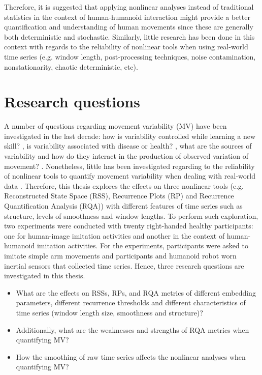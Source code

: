 Therefore, it is suggested that applying nonlinear analyses 
instead of traditional statistics in the context of human-humanoid 
interaction might provide a better quantification and understanding
of human movements since these are generally both deterministic and stochastic.
Similarly, little research has been done in this context 
with regards to the reliability of nonlinear tools 
when using real-world time series 
(e.g. window length, post-processing techniques, 
noise contamination, nonstationarity, chaotic deterministic, etc).



\section{Research questions}
A number of questions regarding movement variability (MV) have been 
investigated in the last decade:
how is variability controlled 
while learning a new skill? \citep{wagner2012, seifert2011, bartlett2007}, 
is variability associated with disease or health? 
\citep{stergiou2006, stergiou2011}, what are the sources of variability 
and how do they interact in the production of observed variation 
of movement? \citep{preatoni2007, preatoni2010, preatoni2013}.
Nonetheless, little has been investigated regarding to the 
reliability of nonlinear tools to quantify movement 
variability \citep{iwanski1998, yao2017}
when dealing with real-world data \citep{bradley2015, caballero2014}.
Therefore, this thesis explores the effects on three nonlinear tools
(e.g. Reconstructed State Space (RSS), Recurrence Plots (RP) and 
Recurrence Quantification Analysis (RQA)) with different features 
of time series such as structure, levels of smoothness and window lengths.
To perform such exploration, two experiments were conducted with twenty 
right-handed healthy participants: one for human-image imitation 
activities and another in the context of human-humanoid imitation 
activities.
For the experiments, participants were asked to imitate simple arm movements
and participants and humanoid robot worn inertial sensors that collected 
time series.
Hence, three research questions are investigated in this thesis.

\begin{itemize}

\item What are the effects on RSSs, RPs, and RQA metrics
	of different embedding parameters, different recurrence thresholds 
	and different characteristics of time series 
	(window length size, smoothness and structure)?

\item Additionally, what are the weaknesses and strengths of 
	RQA metrics when quantifying MV?

\item How the smoothing of raw time series affects the nonlinear analyses
	when quantifying MV?

\end{itemize}




